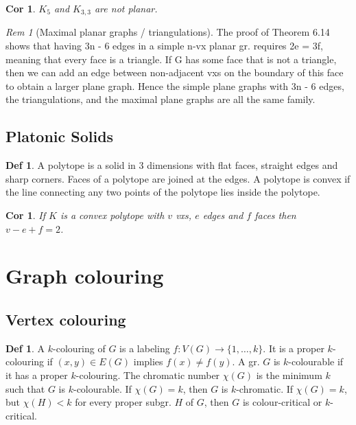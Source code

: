 \documentclass[11pt, fleqn, a4paper, landscape]{article}
\theoremstyle{plain} %
\newtheorem{cor}[thm]{Cor}
\theoremstyle{remark} %
\newtheorem{rem}[thm]{Rem}
\theoremstyle{definition} %
\newtheorem{defi}[thm]{Def}
\begin{document}
\begin{multicols}{5}
\begin{cor}
$K_5$ and $K_{3,3}$ are not planar.
\end{cor}

\begin{rem}[Maximal planar graphs / triangulations]
The proof of Theorem 6.14 shows that
having 3n - 6 edges in a simple n-vx planar gr. requires 2e = 3f, meaning that every face is
a triangle. If G has some face that is not a triangle, then we can add an edge between non-adjacent
vxs on the boundary of this face to obtain a larger plane graph. Hence the simple plane graphs
with 3n - 6 edges, the triangulations, and the maximal plane graphs are all the same family.
\end{rem}

\subsection{Platonic Solids}

\begin{defi}
A polytope is a solid in 3 dimensions with flat faces, straight edges and sharp corners. Faces of a polytope are joined at the edges. A polytope is convex if the line connecting any two points of the polytope lies inside the polytope.
\end{defi}
\addtocounter{thm}{1}
\addtocounter{thm}{1}

\begin{cor}
If $K$ is a convex polytope with $v$ vxs, $e$ edges and $f$ faces then $v - e + f = 2$.
\end{cor}

\section{Graph colouring}
\subsection{Vertex colouring}

\begin{defi}
A $k$-colouring of $G$ is a labeling $f : V (G) \to \{1, \dots , k\}$. It is a proper $k$-colouring if $(x, y) \in E(G)$ implies $f(x) \ne f(y)$. A gr. $G $ is $k$-colourable if it has a proper $k$-colouring. The
chromatic number $\chi(G)$ is the minimum $k$ such that $G$ is $k$-colourable. If $\chi(G) = k$, then $G$ is
$k$-chromatic. If $\chi(G) = k$, but $\chi(H) < k$ for every proper subgr. $H$ of $G$, then $G$ is colour-critical or $k$-critical.


\end{defi}
\end{multicols}
\end{document}

